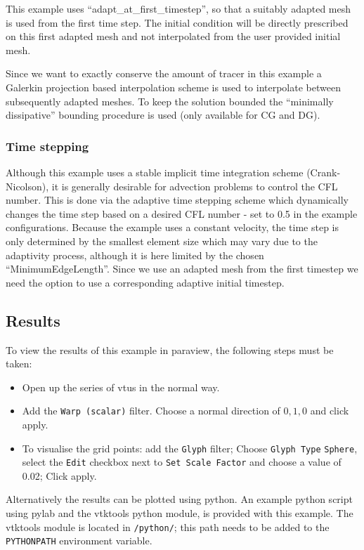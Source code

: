 This example uses ``adapt\_at\_first\_timestep'', so that a suitably
adapted mesh is used from the first time step. The initial condition
will be directly prescribed on this first adapted mesh and not interpolated
from the user provided initial mesh.

Since we want to exactly conserve the amount of tracer in this example
a Galerkin projection based interpolation scheme is used to interpolate
between subsequently adapted meshes. To keep the solution bounded the
``minimally dissipative'' bounding procedure is used (only available for CG and DG).

\subsubsection{Time stepping}
Although this example uses a stable implicit time integration scheme (Crank-Nicolson),
it is generally desirable for advection problems to control the CFL number. This is done
via the adaptive time stepping scheme which dynamically changes the time
step based on a desired CFL number - set to 0.5 in the example configurations. Because the
example uses a constant velocity, the time step is only determined by the smallest
element size which may vary due to the adaptivity process, although it is here
limited by the chosen ``MinimumEdgeLength''. Since we use an adapted mesh from the first
timestep we need the option  to use a corresponding
adaptive initial timestep.

\subsection{Results}
To view the results of this example in paraview, the following steps
must be taken:
\begin{itemize}
\item Open up the series of vtus in the normal way.
\item Add the \texttt{Warp (scalar)} filter. Choose a normal direction of $0,1,0$ and click apply.
\item To visualise the grid points: add the \texttt{Glyph} filter; Choose \texttt{Glyph Type} \texttt{Sphere},
select the \texttt{Edit} checkbox next to \texttt{Set Scale Factor} and choose a value of 0.02; Click apply.
\end{itemize}

Alternatively the results can be plotted using python. An example python script using pylab and the
vtktools python module, is provided with this example. The vtktools module is located in
\texttt{\fluiditysourcepath/python/}; this path needs to be added to the \texttt{PYTHONPATH} environment
variable.

